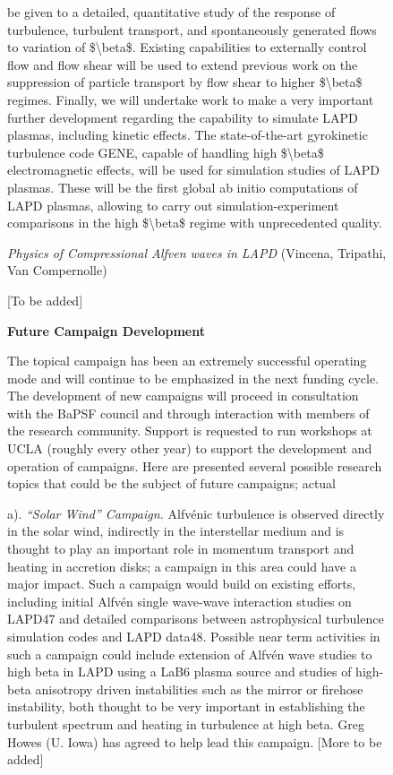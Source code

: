 \documentclass[11pt]{article}
\begin{document}
\begin{description}
\begin{figure}[!htbp]
be given to a detailed, quantitative study of the response of
turbulence, turbulent transport, and spontaneously generated flows to
variation of \$\textbackslash{}beta\$. Existing capabilities to
externally control flow and flow shear will be used to extend previous
work on the suppression of particle transport by flow shear to higher
\$\textbackslash{}beta\$ regimes. Finally, we will undertake work to
make a very important further development regarding the capability to
simulate LAPD plasmas, including kinetic effects. The state-of-the-art
gyrokinetic turbulence code GENE, capable of handling high
\$\textbackslash{}beta\$ electromagnetic effects, will be used for
simulation studies of LAPD plasmas. These will be the first global ab
initio computations of LAPD plasmas, allowing to carry out
simulation-experiment comparisons in the high \$\textbackslash{}beta\$
regime with unprecedented quality.

\emph{Physics of Compressional Alfven waves in LAPD} (Vincena, Tripathi,
Van Compernolle)

{[}To be added{]}


\textbf{Future Campaign Development}

The topical campaign has been an extremely successful operating mode and
will continue to be emphasized in the next funding cycle. The
development of new campaigns will proceed in consultation with the BaPSF
council and through interaction with members of the research community.
Support is requested to run workshops at UCLA (roughly every other year)
to support the development and operation of campaigns. Here are
presented several possible research topics that could be the subject of
future campaigns; actual

a). \emph{``Solar Wind'' Campaign.} Alfvénic turbulence is observed
directly in the solar wind, indirectly in the interstellar medium and is
thought to play an important role in momentum transport and heating in
accretion disks; a campaign in this area could have a major impact. Such
a campaign would build on existing efforts, including initial Alfvén
single wave-wave interaction studies on LAPD47 and detailed comparisons
between astrophysical turbulence simulation codes and LAPD data48.
Possible near term activities in such a campaign could include extension
of Alfvén wave studies to high beta in LAPD using a LaB6 plasma source
and studies of high-beta anisotropy driven instabilities such as the
mirror or firehose instability, both thought to be very important in
establishing the turbulent spectrum and heating in turbulence at high
beta. Greg Howes (U. Iowa) has agreed to help lead this campaign.
{[}More to be added{]}


\end{figure}
\end{description}
\end{document}
